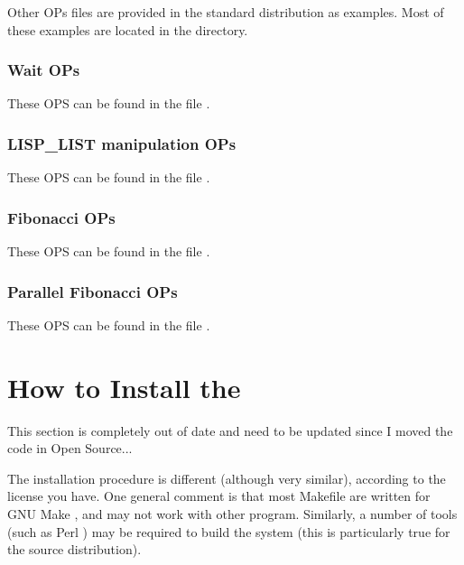 Other OPs files are provided in the standard distribution as examples. Most of
these examples are located in the  directory.



\subsection{Wait OPs}

These OPS can be found in the file .



\subsection{LISP\_LIST manipulation OPs}

These OPS can be found in the file .



\subsection{Fibonacci OPs}

These OPS can be found in the file .



\subsection{Parallel Fibonacci OPs}

These OPS can be found in the file .



\chapter{How to Install the \COPRSDE{}}

This section is completely out of date and need to be updated since I moved
the code in Open Source...


The installation procedure is different (although very similar), according to
the license you have. One general comment is that most Makefile are written for
GNU Make \cite{GNU-make-manual}, and may not work with other 
program. Similarly, a number of tools (such as Perl \cite{perl-manual}) may be
required to build the system (this is particularly true for the source
distribution).




